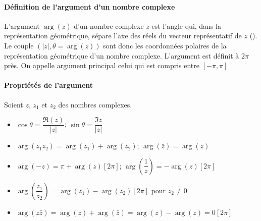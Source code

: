 \paragraph{Définition de l'argument d'un nombre complexe}
L'argument $\arg{(z)}$ d'un nombre complexe $z$ est l'angle qui, dans la représentation géométrique, sépare l'axe des réels du vecteur représentatif de $z$ ().
Le couple $(|z|,\theta=\arg{(z)})$ sont donc les coordonnées polaires de la représentation géométrique d'un nombre complexe.
L'argument est définit à $2\pi$ près. On appelle argument principal celui qui est compris entre $[-\pi,\pi]$

\newpage
\paragraph{Propriétés de l'argument}
Soient $z$, $z_1$ et $z_2$ des nombres complexes.
\begin{itemize}
    \item $\cos\theta=\dfrac{\Re(z)}{|z|}$; $\sin\theta=\dfrac{\Im{z}}{|z|}$
    \item $\arg(z_1z_2)=\arg(z_1)+\arg(z_2)$; $\arg(\bar{z})=\arg(z)$
    \item $\arg(-z)=\pi+\arg(z)[2\pi]$; $\arg\left(\dfrac{1}{z}\right)=-\arg(z)[2\pi]$
    \item $\arg\left(\dfrac{z_1}{z_2}\right)=\arg(z_1)-\arg(z_2)[2\pi]$ pour $z_2\neq0$
    \item $\arg(z\bar{z})=\arg(z)+\arg(\bar{z})=\arg(z)-\arg(z)=0[2\pi]$
\end{itemize}

